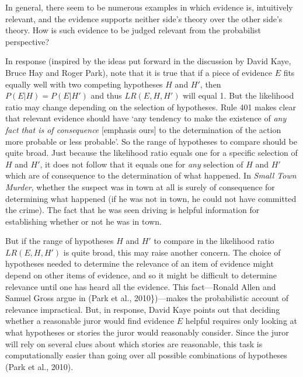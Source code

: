\documentclass[10pt,dvipsnames,enabledeprecatedfontcommands]{scrartcl}
\begin{document}
In general, there seem to be numerous examples in which evidence is,
intuitively relevant, and the evidence supports neither side's theory
over the other side's theory. How is such evidence to be judged relevant
from the probabilist perspective?

In response (inspired by the ideas put forward in the discussion by
David Kaye, Bruce Hay and Roger Park), note that it is true that if a
piece of evidence \(E\) fits equally well with two competing hypotheses
\(H\) and \(H'\), then \(P(E\vert H)=P(E\vert H')\) and thus
\(LR(E,H,H')\) will equal 1. But the likelihood ratio may change
depending on the selection of hypotheses. Rule 401 makes clear that
relevant evidence should have `any tendency to make the existence of
\emph{any fact that is of consequence} {[}emphasis ours{]} to the
determination of the action more probable or less probable'. So the
range of hypotheses to compare should be quite broad. Just because the
likelihood ratio equals one for a specific selection of \(H\) and
\(H'\), it does not follow that it equals one for \textit{any} selection
of \(H\) and \(H'\) which are of consequence to the determination of
what happened. In \textit{Small Town Murder}, whether the suspect was in
town at all is surely of consequence for determining what happened (if
he was not in town, he could not have committed the crime). The fact
that he was seen driving is helpful information for establishing whether
or not he was in town.

But if the range of hypotheses \(H\) and \(H'\) to compare in the
likelihood ratio \(LR(E, H, H')\) is quite broad, this may raise another
concern. The choice of hypotheses needed to determine the relevance of
an item of evidence might depend on other items of evidence, and so it
might be difficult to determine relevance until one has heard all the
evidence. This fact---Ronald Allen and Samuel Gross argue in (Park et
al., 2010\})---makes the probabilistic account of relevance impractical.
But, in response, David Kaye points out that deciding whether a
reasonable juror would find evidence \(E\) helpful requires only looking
at what hypotheses or stories the juror would reasonably consider. Since
the juror will rely on several clues about which stories are reasonable,
this task is computationally easier than going over all possible
combinations of hypotheses (Park et al., 2010).
\end{document}
